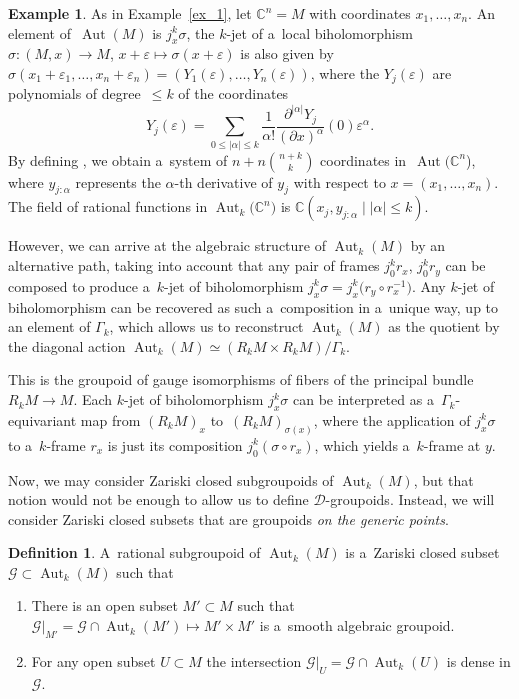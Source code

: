 \documentclass[pdftex]{sigma}
\numberwithin{equation}{section}
\theoremstyle{definition}
\newtheorem{Definition}[Theorem]{Definition}
\newtheorem{Example}[Theorem]{Example}
\begin{document}
\begin{Example}
As in Example~\ref{ex_1}, let $\mathbb C^n = M$ with coordinates $x_1, \dots, x_n$. An element of~${\operatorname{Aut}(M)}$ is $j^k_x\sigma$, the $k$-jet of a~local biholomorphism $\sigma\colon (M,x)\to M$, $x+ \varepsilon \mapsto \sigma(x+ \varepsilon)$ is also given by $\sigma(x_1+ \varepsilon_1,\dots,x_n+ \varepsilon_n) = (Y_1(\varepsilon),\dots,Y_n(\varepsilon))$, where the $Y_j(\varepsilon)$ are polynomials of degree~$\leq k$ of the coordinates
\[
Y_j(\varepsilon) = \sum_{0\leq|\alpha|\leq k}\frac{1}{\alpha!}\frac{\partial^{|\alpha|}Y_j}{(\partial x)^\alpha}(0)\varepsilon^\alpha.
\]
By defining ,
we obtain a~system of $n + n\binom{n+k}{k}$ coordinates  in~$\operatorname{Aut}(\mathbb C^n$), where $y_{j:\alpha}$ represents the $\alpha$-th derivative of $y_j$ with respect to $x = (x_1,\dots,x_n)$. The field of rational functions in $\operatorname{Aut}_k\bigl(\mathbb C^n\bigr)$ is $\mathbb C(x_j, y_{j:\alpha}\mid |\alpha|\leq k)$.
\end{Example}

However, we can arrive at the algebraic structure of $\operatorname{Aut}_k(M)$ by an alternative path, taking into account that any pair of frames $j_0^kr_x$, $j_0^kr_y$ can be composed to produce a~$k$-jet of biholomorphism $j_x^k\sigma = j_x^k\bigl(r_y \circ r_x^{-1}\bigr)$. Any $k$-jet of biholomorphism can be recovered as such a~composition in a~unique way, up to an element of $\Gamma_k$, which allows us to reconstruct $\operatorname{Aut}_k(M)$ as the quotient by the diagonal action $\operatorname{Aut}_k(M) \simeq (R_kM \times R_kM )/\Gamma_k$.

This is the groupoid of gauge isomorphisms of fibers of the principal bundle $R_kM\to M$. Each $k$-jet of biholomorphism $j_x^k\sigma$ can be interpreted as a~$\Gamma_k$-equivariant map from $(R_kM)_x$ to~$(R_kM)_{\sigma(x)}$, where the application of $j^k_x\sigma$ to a~$k$-frame $r_x$ is just its composition $j_0^k(\sigma\circ r_x)$, which yields a~$k$-frame at $y$.

Now, we may consider Zariski closed subgroupoids of $\operatorname{Aut}_k(M)$, but that notion would not be enough to allow us to define $\mathcal D$-groupoids. Instead, we will consider Zariski closed subsets that are groupoids \emph{on the generic points}.

\begin{Definition} A~rational subgroupoid of $\operatorname{Aut}_k(M)$ is a~Zariski closed subset $\mathcal G \subset \operatorname{Aut}_k(M)$ such that
\begin{enumerate}\itemsep=0pt
 \item[(a)] There is an open subset $M'\subset M$ such that $\mathcal G\vert_{M'} = \mathcal G \cap \operatorname{Aut}_k(M')\mapsto M'\times M'$ is a~smooth algebraic groupoid.
 \item[(b)] For any open subset $U\subset M$ the intersection $\mathcal G\vert_U = \mathcal G \cap \operatorname{Aut}_k(U)$ is dense in $\mathcal G$.
\end{enumerate}
\end{Definition}
\end{document}
